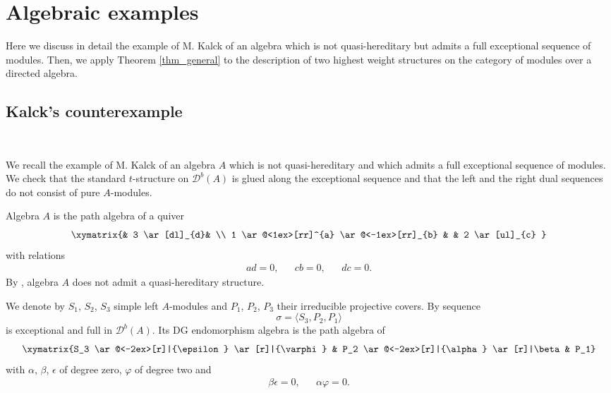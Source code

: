 \documentclass[12pt,a4paper]{amsart}
\newcommand{\f}{\varphi}
\newcommand{\dD}{{\mathcal{D}}}
\newcommand{\tr}{{\mbox{$t$-struc}\-tu\-r}}
\theoremstyle{definition}
\begin{document}
\section{Algebraic examples}

Here we discuss in detail the example of M. Kalck \cite{Kalck} of an algebra which is not quasi-hereditary but admits a full exceptional sequence of modules. Then, we apply Theorem \ref{thm_general} to the description of two highest weight structures on the category of modules over a directed algebra. 

\vspace{0.3cm}
\subsection{Kalck's counterexample}~\\\label{ssec_Kalck}

We recall the example of M. Kalck \cite{Kalck} of an algebra $A$ which is not quasi-hereditary and which admits a full exceptional sequence of modules. We check that the standard \tr e on $\dD^b(A)$ is glued along the exceptional sequence and that the left and the right dual sequences do not consist of pure $A$-modules.

Algebra $A$ is the path algebra of a quiver
\[
\xymatrix{& 3 \ar[dl]_{d}& \\ 1 \ar@<1ex>[rr]^{a} \ar@<-1ex>[rr]_{b} & & 2 \ar[ul]_{c} }
\]
with relations
\begin{align*}
&a d=0,& &cb= 0,& &dc = 0.&
\end{align*}
By \cite[Lemma 5.5]{Kalck}, algebra $A$ does not admit a quasi-hereditary structure.


We denote by $S_1$, $S_2$, $S_3$ simple left $A$-modules and $P_1$, $P_2$, $P_3$ their irreducible projective covers. By \cite[Lemma 5.3]{Kalck} sequence 
$$
\sigma  = \langle S_3, P_2, P_1 \rangle
$$ 
is exceptional and full in $\dD^b(A)$. Its DG endomorphism algebra is the path algebra of  
\[
\xymatrix{S_3 \ar@<-2ex>[r]|{\epsilon} \ar[r]|{\f} & P_2 \ar@<-2ex>[r]|{\alpha} \ar[r]|\beta & P_1}
\]
with $\alpha$, $\beta$, $\epsilon$ of degree zero, $\f$ %
of degree two and
\begin{align}\label{eqtn_relations}
&\beta \epsilon = 0,& &\alpha\f =0.&
\end{align}
\end{document}
